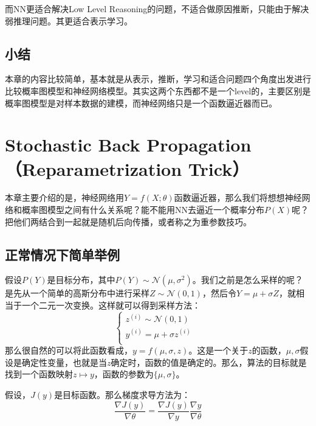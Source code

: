 \documentclass[a4paper]{article}
\begin{document}
而NN更适合解决Low Level Reasoning的问题，不适合做原因推断，只能由于解决弱推理问题。其更适合表示学习。

\subsection{小结}
本章的内容比较简单，基本就是从表示，推断，学习和适合问题四个角度出发进行比较概率图模型和神经网络模型。其实这两个东西都不是一个level的，主要区别是概率图模型是对样本数据的建模，而神经网络只是一个函数逼近器而已。

\section{Stochastic Back Propagation （Reparametrization Trick）}
本章主要介绍的是，神经网络用$Y=f(X;\theta)$函数逼近器，那么我们将想想神经网络和概率图模型之间有什么关系呢？能不能用NN去逼近一个概率分布$P(X)$呢？把他们两结合到一起就是随机后向传播，或者称之为重参数技巧。

\subsection{正常情况下简单举例}
假设$P(Y)$是目标分布，其中$P(Y)\sim \mathcal{N}(\mu,\sigma^2)$。我们之前是怎么采样的呢？是先从一个简单的高斯分布中进行采样$Z\sim \mathcal{N}(0,1)$，然后令$Y = \mu + \sigma Z$，就相当于一个二元一次变换。这样就可以得到采样方法：
\begin{equation}
    \left\{
\begin{array}{ll}
      z^{(i)} \sim \mathcal{N}(0,1) & \\
      y^{(i)} = \mu + \sigma z^{(i)}  & \\
\end{array}
\right.
\end{equation}
那么很自然的可以将此函数看成，{\color{red}$y=f(\mu, \sigma, z)$}。这是一个关于$z$的函数，$\mu, \sigma$假设是确定性变量，也就是当$z$确定时，函数的值是确定的。那么，算法的目标就是找到一个函数映射$z\mapsto y$，函数的参数为$\{ \mu,\sigma \}$。

假设，$J(y)$是目标函数。那么梯度求导方法为：
\begin{equation}
    \frac{\nabla J(y)}{\nabla \theta} = \frac{\nabla J(y)}{\nabla y} \frac{\nabla y}{\nabla \theta} 
\end{equation}
\end{document}
